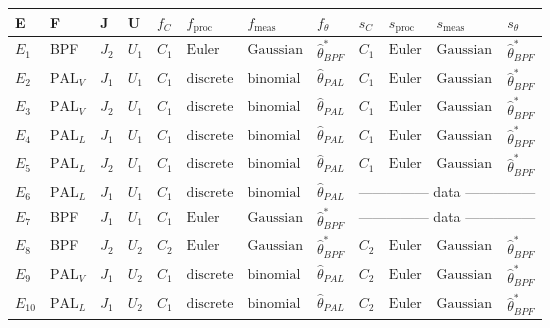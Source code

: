 \documentclass{article}
\newcommand\fproc{f_{\mathrm{proc}}}
\newcommand\fmeas{f_{\mathrm{meas}}}
\newcommand\sproc{s_{\mathrm{proc}}}
\newcommand\smeas{s_{\mathrm{meas}}}
\newcommand\fprocDiscrete{\mathrm{discrete}}
\newcommand\fprocEuler{\mathrm{Euler}}
\newcommand\fmeasBinomial{\mathrm{binomial}}
\newcommand\fmeasGaussian{\mathrm{Gaussian}}
\newcommand\PALL{$\mathrm{PAL}_L$} %
\newcommand\PALV{$\mathrm{PAL}_V$} %
\begin{document}
\begin{table}\label{tab:treatments}
\begin{tabular}{llllllllllll}
E & F & J & U & 
  $f_C$ & $\fproc$ &  $\fmeas$ & $f_{\theta}$ &
  $s_C$ & $\sproc$ &  $\smeas$ & $s_{\theta}$ 
\\
\hline
$E_1$ &  BPF & $J_2$ & $U_1$ & 
  $C_1$ & $\fprocEuler$ & $\fmeasGaussian$ & $\hat\theta^*_{BPF}$ &
  $C_1$ & $\fprocEuler$ & $\fmeasGaussian$ & $\hat\theta^*_{BPF}$
\\
$E_2$ &  \PALV & $J_1$ & $U_1$ & 
  $C_1$ & $\fprocDiscrete$ & $\fmeasBinomial$ & $\hat\theta_{PAL}$ &
  $C_1$ & $\fprocEuler$ & $\fmeasGaussian$ & $\hat\theta^*_{BPF}$
\\
$E_3$ &  \PALV & $J_2$ & $U_1$ & 
  $C_1$ & $\fprocDiscrete$ & $\fmeasBinomial$ & $\hat\theta_{PAL}$ &
  $C_1$ & $\fprocEuler$ & $\fmeasGaussian$ & $\hat\theta^*_{BPF}$
\\
$E_4$ &  \PALL & $J_1$ & $U_1$ & 
  $C_1$ & $\fprocDiscrete$ & $\fmeasBinomial$ & $\hat\theta_{PAL}$ &
  $C_1$ & $\fprocEuler$ & $\fmeasGaussian$ & $\hat\theta^*_{BPF}$
\\
$E_5$ &  \PALL & $J_2$ & $U_1$ & 
  $C_1$ & $\fprocDiscrete$ & $\fmeasBinomial$ & $\hat\theta_{PAL}$ &
  $C_1$ & $\fprocEuler$ & $\fmeasGaussian$ & $\hat\theta^*_{BPF}$
\\
$E_6$ &  \PALL & $J_1$ & $U_1$ & 
  $C_1$ & $\fprocDiscrete$ & $\fmeasBinomial$ & $\hat\theta_{PAL}$ &
  \multicolumn{4}{c}{\hfill --------------- \hfill data \hfill --------------- \hfill}
\\
$E_7$ &  BPF & $J_1$ & $U_1$ & 
  $C_1$ & $\fprocEuler$ & $\fmeasGaussian$ & $\hat\theta^*_{BPF}$ &
  \multicolumn{4}{c}{\hfill --------------- \hfill data \hfill --------------- \hfill}
\\
$E_8$ &  BPF & $J_2$ & $U_2$ & 
  $C_2$ & $\fprocEuler$ & $\fmeasGaussian$ & $\hat\theta^*_{BPF}$ &
  $C_2$ & $\fprocEuler$ & $\fmeasGaussian$ & $\hat\theta^*_{BPF}$
\\
$E_9$ &  \PALV & $J_1$ & $U_2$ & 
  $C_1$ & $\fprocDiscrete$ & $\fmeasBinomial$ & $\hat\theta_{PAL}$ &
  $C_2$ & $\fprocEuler$ & $\fmeasGaussian$ & $\hat\theta^*_{BPF}$
\\
$E_{10}$ &  \PALL & $J_1$ & $U_2$ & 
  $C_1$ & $\fprocDiscrete$ & $\fmeasBinomial$ & $\hat\theta_{PAL}$ &
  $C_2$ & $\fprocEuler$ & $\fmeasGaussian$ & $\hat\theta^*_{BPF}$

\end{tabular}
\end{table}
\end{document}
